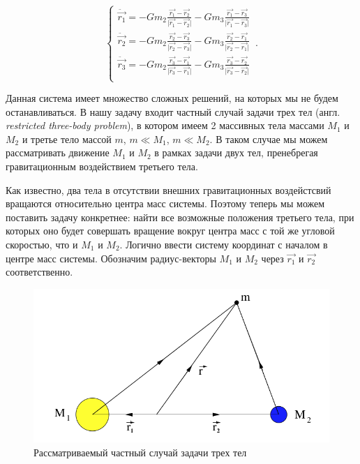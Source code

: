 \documentclass[12pt]{article}
\begin{document}
    \begin{equation}
        \begin{cases}
            \ddot{\vec{r_1}} = -Gm_2\frac{\vec{r_1} - \vec{r_2}}
            {\lvert \vec{r_1} - \vec{r_2} \rvert} -
            Gm_3\frac{\vec{r_1} - \vec{r_3}}{\lvert \vec{r_1} - 
            \vec{r_3} \rvert}\\
            \ddot{\vec{r_2}} = -Gm_2\frac{\vec{r_2} - \vec{r_3}}
            {\lvert \vec{r_2} - \vec{r_3} \rvert} -
            Gm_3\frac{\vec{r_2} - \vec{r_1}}{\lvert \vec{r_2} - 
            \vec{r_1} \rvert}\\
            \ddot{\vec{r_3}} = -Gm_2\frac{\vec{r_3} - \vec{r_1}}
            {\lvert \vec{r_3} - \vec{r_1} \rvert} -
            Gm_3\frac{\vec{r_3} - \vec{r_2}}{\lvert \vec{r_3} - 
            \vec{r_2} \rvert}\\
        \end{cases}\,.
    \end{equation}

    Данная система имеет множество сложных решений, на которых мы не будем
    останавливаться. В нашу задачу входит частный случай задачи трех тел 
    (англ. \textit{restricted three-body problem}), в котором имеем
    2 массивных тела массами $M_1$ и $M_2$ и третье тело массой $m$, 
    $m \ll M_1$, $m \ll M_2$. В таком случае мы можем рассматривать движение
    $M_1$ и $M_2$ в рамках задачи двух тел, пренебрегая гравитационным
    воздействием третьего тела.
    \par Как известно, два тела в отсутствии внешних гравитационных воздейстсвий
    вращаются относительно центра масс системы. Поэтому теперь мы можем
    поставить задачу конкретнее: найти все возможные положения третьего тела,
    при которых оно будет совершать вращение вокруг центра масс с той же угловой
    скоростью, что и $M_1$ и $M_2$. Логично ввести систему координат с началом в
    центре масс системы. Обозначим радиус-векторы $M_1$ и $M_2$ через $\vec{r_1}$
    и $\vec{r_2}$ соответственно.

    \begin{figure}[H]
        \centering
        \includegraphics[scale = 2]{two-bodies.png}
        \caption{Рассматриваемый частный случай задачи трех тел}
    \end{figure}
\end{document}
